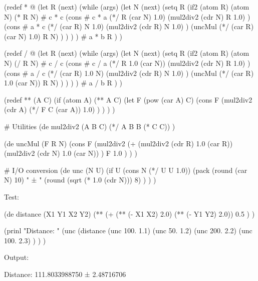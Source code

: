\begin{wideverbatim}


(redef * @
   (let R (next)
      (while (args)
         (let N (next)
            (setq R
               (if2 (atom R) (atom N)
                  (* R N)                                        # c * c
                  (cons                                          # c * a
                     (*/ R (car N) 1.0)
                     (mul2div2 (cdr N) R 1.0) )
                  (cons                                          # a * c
                     (*/ (car R) N 1.0)
                     (mul2div2 (cdr R) N 1.0) )
                  (uncMul (*/ (car R) (car N) 1.0) R N) ) ) ) )  # a * b
      R ) )

(redef / @
   (let R (next)
      (while (args)
         (let N (next)
            (setq R
               (if2 (atom R) (atom N)
                  (/ R N)                                        # c / c
                  (cons                                          # c / a
                     (*/ R 1.0 (car N))
                     (mul2div2 (cdr N) R 1.0) )
                  (cons                                          # a / c
                     (*/ (car R) 1.0 N)
                     (mul2div2 (cdr R) N 1.0) )
                  (uncMul (*/ (car R) 1.0 (car N)) R N) ) ) ) )  # a / b
      R ) )

(redef ** (A C)
   (if (atom A)
      (** A C)
      (let F (pow (car A) C)
         (cons F
            (mul2div2 (cdr A) (*/ F C (car A)) 1.0) ) ) ) )

\end{wideverbatim}

\begin{wideverbatim}


# Utilities
(de mul2div2 (A B C)
   (*/ A B B (* C C)) )

(de uncMul (F R N)
   (cons F
      (mul2div2
         (+
            (mul2div2 (cdr R) 1.0 (car R))
            (mul2div2 (cdr N) 1.0 (car N)) )
         F
         1.0 ) ) )

# I/O conversion
(de unc (N U)
   (if U
      (cons N (*/ U U 1.0))
      (pack
         (round (car N) 10)
         " ± "
         (round (sqrt (* 1.0 (cdr N))) 8) ) ) )

Test:

(de distance (X1 Y1 X2 Y2)
   (**
      (+ (** (- X1 X2) 2.0) (** (- Y1 Y2) 2.0))
      0.5 ) )

(prinl "Distance: "
   (unc
      (distance
         (unc 100. 1.1)
         (unc 50. 1.2)
         (unc 200. 2.2)
         (unc 100. 2.3) ) ) )

Output:

Distance: 111.8033988750 ± 2.48716706

\end{wideverbatim}

